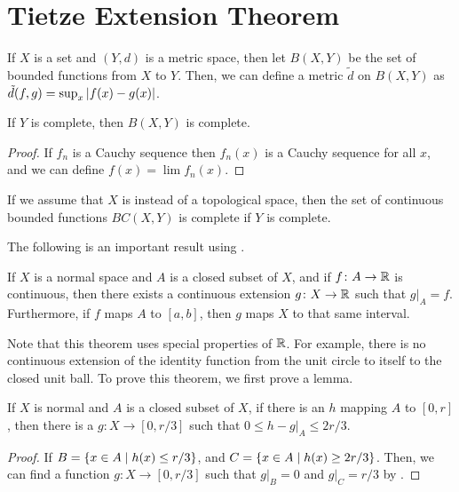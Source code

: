\section{Tietze Extension Theorem}

If $X$ is a set and $(Y, d)$ is a metric space, then let $B(X, Y)$ be the set of bounded functions from $X$ to $Y$. Then, we can define a metric $\tilde d$ on $B(X, Y)$ as $\tilde d(f, g) = \sup_x \abs{f(x) - g(x)}$.

\begin{proposition}
    If $Y$ is complete, then $B(X, Y)$ is complete.
\end{proposition}

\begin{proof}
    If $f_n$ is a Cauchy sequence then $f_n(x)$ is a Cauchy sequence for all $x$, and we can define $f(x) = \lim f_n(x)$.
\end{proof}

\begin{proposition}
    If we assume that $X$ is instead of a topological space, then the set of continuous bounded functions $BC(X, Y)$ is complete if $Y$ is complete.
\end{proposition}

The following is an important result using .

\begin{theorem}
    \label{thm:tietze}
    If $X$ is a normal space and $A$ is a closed subset of $X$, and if $f \colon A \to \mathbb R$ is continuous, then there exists a continuous extension $g \colon X \to \mathbb R$ such that $g\vert_A = f$. Furthermore, if $f$ maps $A$ to $[a, b]$, then $g$ maps $X$ to that same interval.
\end{theorem}

Note that this theorem uses special properties of $\mathbb R$. For example, there is no continuous extension of the identity function from the unit circle to itself to the closed unit ball. To prove this theorem, we first prove a lemma.

\begin{lemma}
    If $X$ is normal and $A$ is a closed subset of $X$, if there is an $h$ mapping $A$ to $[0, r]$, then there is a $g\colon X \to [0, r/3]$ such that $0 \le h - g\vert_A \le 2r/3$.
\end{lemma}

\begin{proof}
    If $B = \qty{x \in A \mid h(x) \le r/3}$, and $C = \qty{x \in A \mid h(x) \ge 2r/3}$. Then, we can find a function $g\colon X \to [0, r/3]$ such that $g\vert_B = 0$ and $g\vert_C = r/3$ by .
\end{proof}

